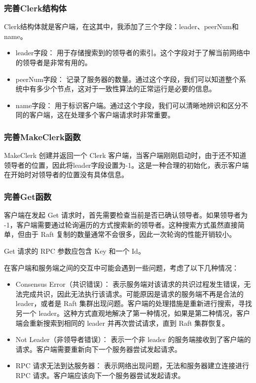 \documentclass[]{article}
\begin{document}
	\subsubsection{完善Clerk结构体}
	Clerk结构体就是客户端，在这其中，我添加了三个字段：leader、peerNum和name。
	
	\begin{itemize}
		\item leader字段： 用于存储搜索到的领导者的索引。这个字段对于了解当前网络中的领导者是非常有用的。
		\item peerNum字段： 记录了服务器的数量。通过这个字段，我们可以知道整个系统中有多少个节点，这对于一致性算法的正常运行是必要的信息。
		\item name字段： 用于标识客户端。通过这个字段，我们可以清晰地辨识和区分不同的客户端，这在处理多个客户端请求时非常重要。
	\end{itemize}
	\subsubsection{完善MakeClerk函数}
	MakeClerk 创建并返回一个 Clerk 客户端，当客户端刚刚启动时，由于还不知道领导者的位置，因此将leader字段设置为-1。这是一种合理的初始化，表示客户端在开始时对领导者的位置没有具体信息。
	\subsubsection{完善Get函数}
	客户端在发起 Get 请求时，首先需要检查当前是否已确认领导者。如果领导者为 -1，客户端需要通过轮询遍历的方式搜索新的领导者。这种搜索方式虽然直接简单，但由于 Raft 复制的数量通常不会很多，因此一次轮询的性能开销较小。
	
	Get 请求的 RPC 参数应包含 Key 和一个 Id。
	
	在客户端和服务端之间的交互中可能会遇到一些问题，考虑了以下几种情况：
	\begin{itemize}
		\item Consensus Error（共识错误）： 表示服务端对该请求的共识过程发生错误，无法完成共识，因此无法执行该请求。可能原因是请求的服务端不再是合法的 leader，或者是 Raft 集群出现问题。客户端的处理措施是重新进行搜索，寻找另一个 leader。这种方式直观地解决了第一种情况，如果是第二种情况，客户端会重新搜索到相同的 leader 并再次尝试请求，直到 Raft 集群恢复。
		\item Not Leader（非领导者错误）： 表示一个非 leader 的服务端接收到了客户端的请求。客户端需要重新向下一个服务器尝试发起请求。
		\item RPC 请求无法到达服务器： 表示网络出现问题，无法和服务器建立连接进行 RPC 请求。客户端应该向下一个服务器尝试发起请求。
	\end{itemize}
\end{document}
